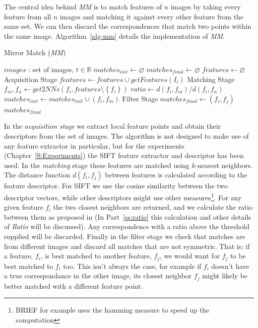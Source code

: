 The central idea behind \emph{MM} is to match features of $n$ images by 
taking every feature from all $n$ images and matching it against every 
other feature from the same set. We can then discard the correspondences 
that match two points within the same image. Algorithm~\ref{alg-mm} 
details the implementation of \emph{MM}.

\begin{algorithm}[htb]
\caption{Mirror Match (\emph{MM})}
\label{alg-mm}
\begin{algorithmic}
\Require $images$ : set of images, $t \in \mathbb{R}$
\State $matches_{init}\gets \varnothing$
\State $matches_{final}\gets \varnothing$
\State $features\gets \varnothing$
 \Comment Acquisition Stage
	\State $features\gets features \cup getFeatures(I_i)$
\EndFor
{} \Comment Matching Stage
	\State $f_m,f_n \gets get2NNs(f_i, features \setminus 
	\left\{f_i\right\})$
    \State $ratio \gets d(f_i, f_m) / d(f_i, f_n)$
		\State $matches_{init} \gets matches_{init} \cup \left(f_i, f_m\right)$
	\EndIf
\EndFor
{} \Comment Filter 
Stage
		\State $matches_{final} \gets (f_i, f_j)$
	\EndIf
\EndFor \\
\Return $matches_{final}$
\end{algorithmic}
\end{algorithm}

In the \emph{acquisition stage} we extract local feature points and 
obtain their descriptors from the set of images. The algorithm is not 
designed to make use of any feature extractor in particular, but for the
experiments (Chapter~\ref{S:Experiments}) the SIFT feature extractor and
descriptor has been used. In the \emph{matching} stage these features 
are matched using $k$-nearest neighbors.  The distance function $d(f_i, 
f_j)$ between features is calculated according to the feature 
descriptor. For SIFT we use the cosine similarity between the two 
descriptor vectors, while other descriptors might use other 
measures\footnote{BRIEF for example uses the hamming measure to speed up 
the computation}.  For any given feature $f_i$ the two closest neighbors 
are returned, and we calculate the ratio between them as proposed in 
\cite{lowe2004sift} (In Part~\ref{ss:ratio} this calculation and other 
details of \emph{Ratio} will be discussed).  Any correspondence with a 
ratio above the threshold supplied will be discarded. Finally in the 
filter stage we check that matches are from different images and discard 
all matches that are not symmetric. That is; if a feature, $f_i$, is 
best matched to another feature, $f_j$, we would want for $f_j$ to be 
best matched to $f_i$ too.
This isn't always the case, for example if $f_i$ doesn't have a true 
correspondance in the other image, its closest neighbor $f_j$ might 
likely be better matched with a different feature point.

